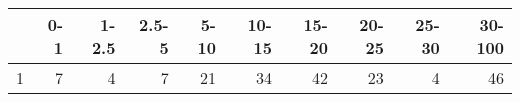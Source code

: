 \begin{table}[ht]
\centering
\begin{tabular}{rrrrrrrrrr}
  \hline
 & 0-1 & 1-2.5 & 2.5-5 & 5-10 & 10-15 & 15-20 & 20-25 & 25-30 & 30-100 \\ 
  \hline
1 &   7 &   4 &   7 &  21 &  34 &  42 &  23 &   4 &  46 \\ 
   \hline
\end{tabular}
\end{table}

